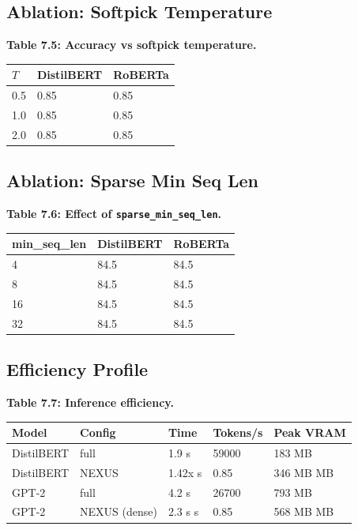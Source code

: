 \subsection{Ablation: Softpick Temperature}

\textbf{Table 7.5: Accuracy vs softpick temperature.}

\begin{table}[H]
\centering
\small
\begin{tabular}{lll}
\toprule
\textbf{$T$} & \textbf{DistilBERT} & \textbf{RoBERTa} \\
\midrule
0.5 & 0.85 & 0.85 \\
1.0 & 0.85 & 0.85 \\
2.0 & 0.85 & 0.85 \\
\bottomrule
\end{tabular}
\end{table}

\subsection{Ablation: Sparse Min Seq Len}

\textbf{Table 7.6: Effect of \texttt{sparse\_min\_seq\_len}.}

\begin{table}[H]
\centering
\small
\begin{tabular}{lll}
\toprule
\textbf{min\_seq\_len} & \textbf{DistilBERT} & \textbf{RoBERTa} \\
\midrule
4 & 84.5 & 84.5 \\
8 & 84.5 & 84.5 \\
16 & 84.5 & 84.5 \\
32 & 84.5 & 84.5 \\
\bottomrule
\end{tabular}
\end{table}

\subsection{Efficiency Profile}

\textbf{Table 7.7: Inference efficiency.}

\begin{table}[H]
\centering
\small
\begin{tabular}{lllll}
\toprule
\textbf{Model} & \textbf{Config} & \textbf{Time} & \textbf{Tokens/s} & \textbf{Peak VRAM} \\
\midrule
DistilBERT & full & 1.9 s & 59000 & 183 MB \\
DistilBERT & NEXUS & 1.42x s & 0.85 & 346 MB MB \\
GPT-2 & full & 4.2 s & 26700 & 793 MB \\
GPT-2 & NEXUS (dense) & 2.3 s s & 0.85 & 568 MB MB \\
\bottomrule
\end{tabular}
\end{table}

